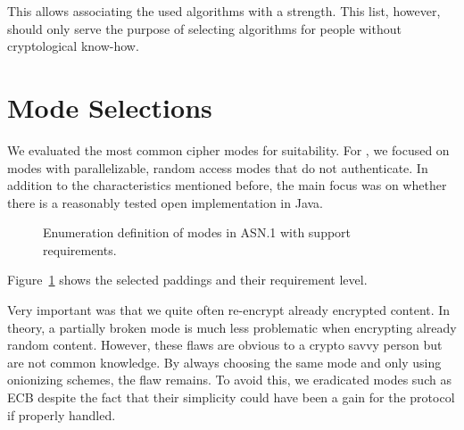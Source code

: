 This allows associating the used algorithms with a strength. This list, however, should only serve the purpose of selecting algorithms for people without cryptological know-how.

\section{Mode Selections}\label{sec:modeSelection}
We evaluated the most common cipher modes for suitability. For \MessageVortex, we focused on modes with parallelizable, random access modes that do not authenticate. In addition to the characteristics mentioned before, the main focus was on whether there is a reasonably tested open implementation in Java.

\begin{figure}[ht]
	
	\caption{Enumeration definition of modes in ASN.1 with support requirements.}
	\label{fig:defModes}
\end{figure}

Figure~\ref{fig:defModes} shows the selected paddings and their requirement level.

Very important was that we quite often re-encrypt already encrypted content. In theory, a partially broken mode is much less problematic when encrypting already random content. However, these flaws are obvious to a crypto savvy person but are not common knowledge. By always choosing the same mode and only using onionizing schemes, the flaw remains. To avoid this, we eradicated modes such as ECB despite the fact that their simplicity could have been a gain for the protocol if properly handled.

